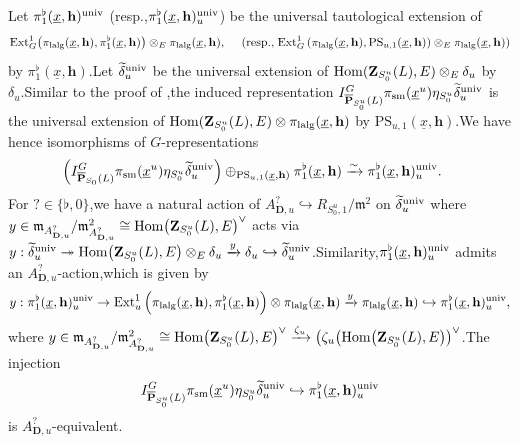 \documentclass[10pt]{article}
\newcommand{\homo}{{\rm Hom}}
\newcommand{\ext}{{\rm Ext}}
\newcommand{\op}{{\overline{{\mathbf{P}}}}}
\newcommand{\sm}{{\rm sm}}
\newcommand{\lalg}{{\rm lalg}}
\newcommand{\Dpik}{{\mathbf{D}}}
\newcommand{\univ}{{\rm univ}}
\newcommand{\bZ}{{\mathbf{Z}}}
\newcommand{\bh}{{\mathbf{h}}}
\newcommand{\fm}{{\mathfrak{m}}}
\begin{document}
Let $\pi^{\flat}_{1}(\underline{x},\bh)^{\univ}$ (resp.,\;$\pi^{\flat}_{1}(\underline{x},\bh)_u^{\univ}$) be the universal tautological extension of
\[\ext^1_{G}\big(\pi_{\lalg}(\underline{x},\bh),\pi^{\flat}_1(\underline{x},\bh)\big)\otimes_E \pi_{\lalg}(\underline{x},\bh),\;\quad(\text{resp.,\;}\ext^1_{G}\left(\pi_{\lalg}(\underline{x},\bh),\mathrm{PS}_{u,1}(\underline{x},\bh)\right)\otimes_E \pi_{\lalg}(\underline{x},\bh))\]
 by $\pi^{\flat}_{1}(\underline{x},\bh)$.\;Let $\widetilde{\delta}_u^{\univ}$ be the universal extension of $\homo(\bZ_{S^u_0}(L),E)\otimes_E\delta_u$ by $\delta_u$.\;Similar to the proof of \cite[Lemma 3.35]{ParaDing2024},\;the induced representation $I^G_{\op_{S^u_0}(L)}\pi_{\sm}(\underline{x}^u)\eta_{S^u_0}\widetilde{\delta}_u^{\univ}$  is the universal extension of $\homo(\bZ_{S^u_0}(L),E)\otimes \pi_{\lalg}(\underline{x},\bh)$ by $\mathrm{PS}_{u,1}(\underline{x},\bh)$.\;We have hence  isomorphisms of $G$-representations
\begin{equation}
	\begin{aligned}
		&\left(I^G_{\op_{S_0}(L)}\pi_{\sm}(\underline{x}^u)\eta_{S^u_0}\widetilde{\delta}_u^{\univ}\right)\oplus_{\mathrm{PS}_{u,1}(\underline{x},\bh)}\pi^{\flat}_{1}(\underline{x},\bh)\xrightarrow{\sim }\pi^{\flat}_{1}(\underline{x},\bh)_u^{\univ}.\;
	\end{aligned}
\end{equation}
For $?\in\{\flat,0\}$,\;we have a natural action of $A^{?}_{\Dpik,u}\hookrightarrow R_{S_0^u,1}/\fm^2$ on $\widetilde{\delta}_u^{\univ}$ where $y\in \fm_{A^{?}_{\Dpik,u}}/\fm^2_{A^{?}_{\Dpik,u}}\cong \homo\big(\bZ_{S^u_0}(L),E\big)^{\vee}$ acts via
$y:\widetilde{\delta}_u^{\univ}\twoheadrightarrow \homo\big(\bZ_{S^u_0}(L),E\big)\otimes_E\delta_u\xrightarrow{y}\delta_u\hookrightarrow \widetilde{\delta}_u^{\univ}$.\;Similarity,\;$\pi^{\flat}_{1}(\underline{x},\bh)_u^{\univ}$ admits an $A^{?}_{\Dpik,u}$-action,\;which is given by 
\[y:\pi^{\flat}_{1}(\underline{x},\bh)_u^{\univ}\rightarrow \ext^1_{u}\left(\pi_{\lalg}(\underline{x},\bh),\pi^{\flat}_{1}(\underline{x},\bh)\right)\otimes \pi_{\lalg}(\underline{x},\bh)\xrightarrow{y}\pi_{\lalg}(\underline{x},\bh)\hookrightarrow \pi^{\flat}_{1}(\underline{x},\bh)_u^{\univ},\]
where $y\in \fm_{A^{?}_{\Dpik,u}}/\fm^2_{A^{?}_{\Dpik,u}}\cong \homo\big(\bZ_{S^u_0}(L),E\big)^{\vee}\xrightarrow{\zeta_u}\big(\zeta_u\big(\homo\big(\bZ_{S^u_0}(L),E\big)\big)^{\vee}$.\;The injection
\[I^G_{\op_{S^u_0}(L)}\pi_{\sm}(\underline{x}^u)\eta_{S^u_0}\widetilde{\delta}_u^{\univ}\hookrightarrow \pi^{\flat}_{1}(\underline{x},\bh)_u^{\univ}\] is $A^{?}_{\Dpik,u}$-equivalent.\;
\end{document}
